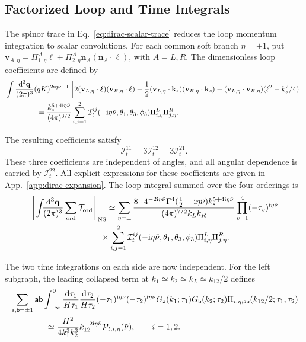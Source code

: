 \documentclass[a4paper,12pt]{article}
\def\di{{\mathrm{d}}}
\def\mb{\mathbf}
\def\ii{\mathrm{i}}
\def\tn{\tilde\nu}
\def\aa{\mathsf{a}}
\def\bb{\mathsf{b}}
\begin{document}
\subsection{Factorized Loop and Time Integrals}
\label{sec:dirac-factorized}
The spinor trace in Eq.~\eqref{eq:dirac-scalar-trace} reduces the loop momentum integration to scalar convolutions.
For each common soft branch $\eta=\pm1$, put $\mb v_{A,\eta}=\Pi^A_{1,\eta}\bm\ell +\Pi^A_{2,\eta}\mb n_A(\mb n_A\cdot\bm\ell)$, with $A=L,R$.
The dimensionless loop coefficients are defined by
\begin{align}
 &\int\frac{\di^3\mb q}{(2\pi)^3}(qK)^{2\ii\eta\tn-1}
 \left[2(\mb v_{L,\eta}\cdot\bm\ell)(\mb v_{R,\eta}\cdot\bm\ell)
 -\frac12(\mb v_{L,\eta}\cdot\mb k_s)(\mb v_{R,\eta}\cdot\mb k_s)
 -(\mb v_{L,\eta}\cdot\mb v_{R,\eta})(\ell^2-k_s^2/4)\right]\nonumber\\
 &\hspace{15mm}=\frac{k_s^{5+4\ii\eta\tn}}{(4\pi)^{3/2}}
 \sum_{i,j=1}^2\mathcal I^{ij}_t(-\ii\eta\tn,\theta_1,\theta_3,\phi_3)
 \Pi^L_{i,\eta}\Pi^R_{j,\eta}.
 \label{eq:dirac-loop-definition}
\end{align}

The resulting coefficients satisfy
\begin{equation}
 \mathcal I^{11}_t=3\mathcal I^{12}_t=3\mathcal I^{21}_t.
 \label{eq:dirac-loop-relations}
\end{equation}
These three coefficients are independent of angles, and all angular dependence is carried by $\mathcal I_t^{22}$.
All explicit expressions for these coefficients are given in App.~\ref{app:dirac-expansion}.
The loop integral summed over the four orderings is
\begin{align}
 & \left[ \int_{}\frac{\di^3\mb q}{(2\pi)^3}
 \sum_{\mathrm{ord}}\mathcal T^{\mathrm{}}_{\mathrm{ord}} \right]_{\mathrm{NS}}
 \simeq \sum_{\eta=\pm} \frac{8\cdot4^{-2\ii\eta\tn}\Gamma^4(\tfrac12-\ii\eta\tn)
 k_s^{5+4\ii\eta\tn}}{(4\pi)^{7/2}k_Lk_R}
 \prod_{v=1}^4(-\tau_v)^{\ii\eta\tn}\nonumber\\
 &\hspace{30mm}\times
 \sum_{i,j=1}^2\mathcal I^{ij}_t(-\ii\eta\tn,\theta_1,\theta_3,\phi_3)
 \Pi^L_{i,\eta}\Pi^R_{j,\eta}.
 \label{eq:dirac-cut-loop}
\end{align}

The two time integrations on each side are now independent.
For the left subgraph, the leading collapsed term at $k_1\simeq k_2\simeq k_L\simeq k_{12}/2$ defines
\begin{align}
 &\sum_{\aa,\bb=\pm1}\aa\bb
 \int_{-\infty}^0\frac{\di\tau_1}{H\tau_1}\frac{\di\tau_2}{H\tau_2}
 (-\tau_1)^{\ii\eta\tn}(-\tau_2)^{\ii\eta\tn}
 G_\aa(k_1;\tau_1)G_\bb(k_2;\tau_2)
 \Pi_{i,\eta;\aa\bb}(k_{12}/2;\tau_1,\tau_2)\nonumber\\
 &\hspace{15mm}\simeq\frac{H^2}{4k_1^3k_2^3}
 k_{12}^{-2\ii\eta\tn}\mathcal P_{t,i,\eta}(\tn),
 \qquad i=1,2.
 \label{eq:dirac-time-definition}
\end{align}
\end{document}
